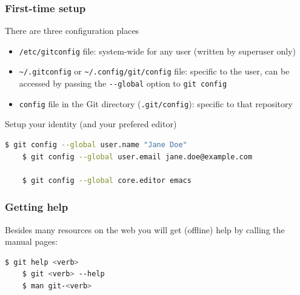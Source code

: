 \documentclass{beamer}
\begin{document}
\begin{frame}[fragile]
  \frametitle{First-time setup}
  There are three configuration places
  \begin{itemize}
    \item \verb+/etc/gitconfig+ file: system-wide for any user (written by superuser only)
    \item \verb+~/.gitconfig+ or \verb+~/.config/git/config+ file: specific to the user, can be accessed by passing the \verb+--global+ option to \verb+git config+
    \item \verb+config+ file in the Git directory (\verb+.git/config+): specific to that repository
  \end{itemize}

  Setup your identity (and your prefered editor)
  \begin{lstlisting}[language=bash]
    $ git config --global user.name "Jane Doe"
    $ git config --global user.email jane.doe@example.com

    $ git config --global core.editor emacs
  \end{lstlisting}
\end{frame}

\begin{frame}[fragile]
  \frametitle{Getting help}
  Besides many resources on the web you will get (offline) help by calling the manual pages:

  \begin{lstlisting}[language=bash]
    $ git help <verb>
    $ git <verb> --help
    $ man git-<verb>
  \end{lstlisting}
\end{frame}
\end{document}
